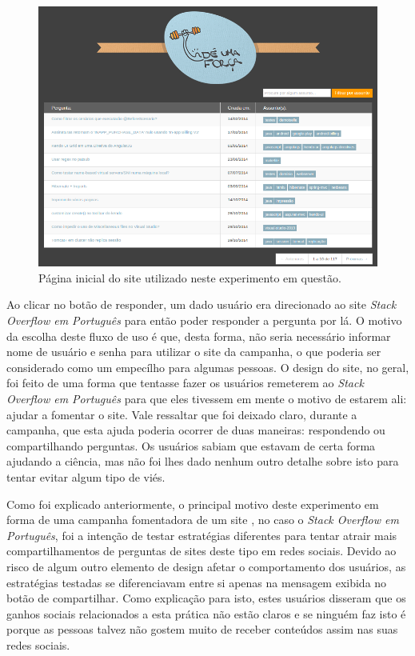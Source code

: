     \begin{figure}[H]
        \center
        \includegraphics[scale=0.55]{./figuras/printUmaForca1-2.png}
        \caption{Página inicial do site utilizado neste experimento em questão.}
        \label{fig:printUmaForca1-2}
    \end{figure}

Ao clicar no botão de responder, um dado usuário era direcionado ao site \textit{Stack Overflow em Português} para então poder responder a pergunta por lá. O motivo da escolha deste fluxo de uso é que, desta forma, não seria necessário informar nome de usuário e senha para utilizar o site da campanha, o que poderia ser considerado como um empecílho para algumas pessoas. O design do site, no geral, foi feito de uma forma que tentasse fazer os usuários remeterem ao \textit{Stack Overflow em Português} para que eles tivessem em mente o motivo de estarem ali: ajudar a fomentar o site. Vale ressaltar que foi deixado claro, durante a campanha, que esta ajuda poderia ocorrer de duas maneiras: respondendo ou compartilhando perguntas. Os usuários sabiam que estavam de certa forma ajudando a ciência, mas não foi lhes dado nenhum outro detalhe sobre isto para tentar evitar algum tipo de viés.

Como foi explicado anteriormente, o principal motivo deste experimento em forma de uma campanha fomentadora de um site \qanospace, no caso o \textit{Stack Overflow em Português}, foi a intenção de testar estratégias diferentes para tentar atrair mais compartilhamentos de perguntas de sites deste tipo em redes sociais. Devido ao risco de algum outro elemento de design afetar o comportamento dos usuários, as estratégias testadas se diferenciavam entre si apenas na mensagem exibida no botão de compartilhar. Como explicação para isto, estes usuários disseram que os ganhos sociais relacionados a esta prática não estão claros e se ninguém faz isto é porque as pessoas talvez não gostem muito de receber conteúdos assim nas suas redes sociais. 

